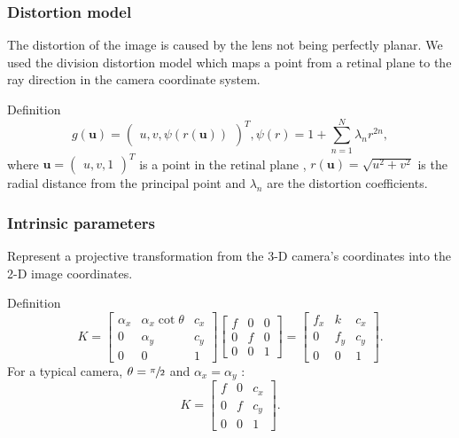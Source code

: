 \documentclass{beamer}
\begin{document}
\begin{frame}
	\frametitle{Distortion model}
	The distortion of the image is caused by the lens not being perfectly planar.
	We used the division distortion model
	\cite{fitzgibbonSimultaneousLinearEstimation2001} which maps a
	point from a retinal plane to the
	ray direction in the camera coordinate system.
	\begin{exampleblock}{Definition}
		\begin{equation*}
			g(\mathbf{u}) = \begin{pmatrix}
				u, v, \psi(r(\mathbf{u}))
			\end{pmatrix}^{T},
			\psi(r) = 1 + \sum_{n = 1}^{N} \lambda_n r^{2n},
		\end{equation*}
		where
		\(\mathbf{u} = \begin{pmatrix}
			u, v, 1
		\end{pmatrix}^{T}\) is a point in the retinal plane
		, \(r(\mathbf{u}) = \sqrt{u^2 + v^2}\) is the radial distance from the
		principal point and \(\lambda_n\) are the distortion coefficients.
	\end{exampleblock}
\end{frame}

\begin{frame}
	\frametitle{Intrinsic parameters}
	Represent a projective transformation from the 3-D camera’s coordinates into
	the 2-D image coordinates.

	\begin{exampleblock}{Definition}
		\begin{equation*}
			K = \begin{bmatrix}
				\alpha_x & \alpha_x \cot \theta & c_x \\
				0        & \alpha_y             & c_y \\
				0        & 0                    & 1
			\end{bmatrix} \begin{bmatrix}
				f & 0 & 0 \\
				0 & f & 0 \\
				0 & 0 & 1
			\end{bmatrix} = \begin{bmatrix}
				f_x & k   & c_x \\
				0   & f_y & c_y \\
				0   & 0   & 1
			\end{bmatrix}.
		\end{equation*}
		For a typical camera, \(\theta = \sfrac{\pi}{2}\) and \(\alpha_x = \alpha_y\)
		\cite{hartleyMultipleViewGeometry2004}:
		\begin{equation*}
			K = \begin{bmatrix}
				f & 0 & c_x \\
				0 & f & c_y \\
				0 & 0 & 1
			\end{bmatrix}.
		\end{equation*}
	\end{exampleblock}

\end{frame}
\end{document}
